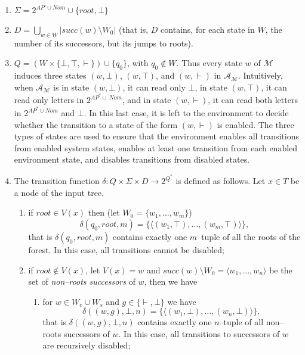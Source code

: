 \documentclass{LMCS}
\theoremstyle{plain}
\def \A             {\mathcal{A}}
\def \M             {\mathcal{M}}
\def \node          {V}
\def \rr            {\mathit{root}}
\newcommand \tpl[1] {\langle #1 \rangle}
\begin{document}
\begin{enumerate}[$\bullet$]
    \item
    $\Sigma = 2^{AP'\cup Nom} \cup \{\rr,\bot\}$

    \item
    $D = \bigcup_{w \in W} |succ(w) \setminus W_0|$ (that is, $D$ contains, for
    each state in $W$, the number of its successors, but its jumps to roots).

    \item
    $Q = (W \times \{\bot,\top,\vdash\}) \cup \{q_0\}$, with $q_0 \not\in W$. Thus
    every state $w$ of $\M$ induces three states $(w,\bot)$, $(w,\top)$, and
    $(w,\vdash)$ in $\A_{\M}$. Intuitively, when $\A_{\M}$ is in state $(w,\bot)$,
    it can read only $\bot$, in state $(w,\top)$, it can read only letters in
    $2^{AP^*\cup\ Nom}$, and in state $(w,\vdash)$, it can read both letters in
    $2^{AP^*\cup Nom}$ and $\bot$. In this last case, it is left to the environment
    to decide whether the transition to a state of the form $(w,\vdash)$ is
    enabled. The three types of states are used to ensure that the environment
    enables all transitions from enabled system states, enables at least one
    transition from each enabled environment state, and disables transitions from
    disabled states.

    \item
    The transition function $\delta: Q \times \Sigma \times D
    \rightarrow 2^{Q^*}$ is defined as follows. Let $x \in T$ be a
    node of the input tree.
    \begin{enumerate}[$-$]
    \item
    if $\rr \in \node(x)$ then (let $W_0 = \{w_1, \ldots, w_m\}$)
        $$\delta(q_0,\rr,m) = \{ \tpl{(w_1,\top), \ldots, (w_m,\top)} \},$$
    that is $\delta(q_0,\rr,m)$ contains exactly one $m$--tuple of all
    the roots of the forest. In this case, all transitions cannot be
    disabled;

    \item
    if $\rr \not \in \node(x)$, let $\node(x) = w$ and $succ(w)
    \setminus W_0=\tpl{w_1, \ldots, w_n}$ be the set of
    \emph{non--roots successors} of $w$, then we have

\begin{enumerate}[$*$]
\item
for $w \in W_e \cup W_s$ and $g \in \{\vdash,\bot\}$ we have
    $$\delta((w,g),\bot,n) = \{ \tpl{(w_1,\bot), \ldots, (w_n,\bot)} \},$$
that is $\delta((w,g),\bot,n)$ contains exactly one $n$--tuple of
all non--roots successors of $w$. In this case, all transitions to
successors of $w$ are recursively disabled;


\end{enumerate}
\end{enumerate}
\end{enumerate}
\end{document}
